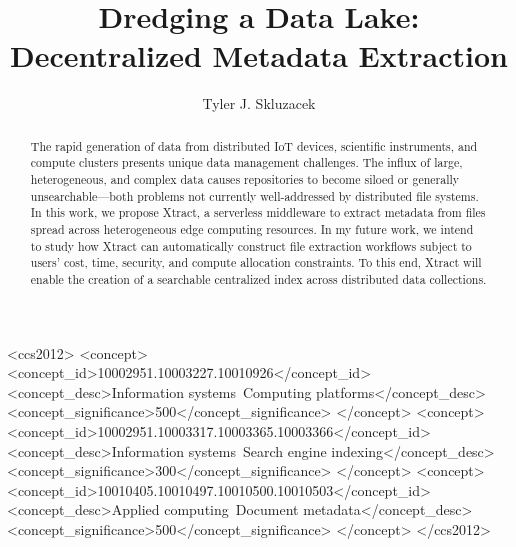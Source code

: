 \documentclass[sigconf, 9pt]{acmart}
\newcommand{\name}{Xtract}
\begin{document}
\title{Dredging a Data Lake: Decentralized Metadata Extraction}

\author{Tyler J. Skluzacek} 


\renewcommand{\shortauthors}{Skluzacek et al.}

\begin{abstract}

The rapid generation of data from distributed IoT devices, scientific instruments, and compute clusters presents
unique data management challenges. The influx of large, heterogeneous, and complex data causes repositories to become 
siloed or generally unsearchable---both problems not currently well-addressed by distributed file systems.  
In this work, we propose \name{}, a serverless middleware 
to extract metadata from files spread across heterogeneous edge computing resources. 
In my future work, we intend to study how \name{} can
automatically construct file extraction workflows subject to 
users' cost, time, security, and compute allocation constraints. 
To this end, \name{} will enable the creation of a searchable centralized index across distributed data collections.


\end{abstract}

\begin{CCSXML}
<ccs2012>
<concept>
<concept_id>10002951.10003227.10010926</concept_id>
<concept_desc>Information systems~Computing platforms</concept_desc>
<concept_significance>500</concept_significance>
</concept>
<concept>
<concept_id>10002951.10003317.10003365.10003366</concept_id>
<concept_desc>Information systems~Search engine indexing</concept_desc>
<concept_significance>300</concept_significance>
</concept>
<concept>
<concept_id>10010405.10010497.10010500.10010503</concept_id>
<concept_desc>Applied computing~Document metadata</concept_desc>
<concept_significance>500</concept_significance>
</concept>
</ccs2012>
\end{CCSXML}



\maketitle
\end{document}
